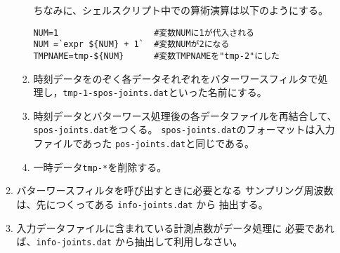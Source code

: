 \documentclass{jarticle}
\begin{document}
\begin{enumerate}
\begin{enumerate}
\begin{enumerate}
      ちなみに、シェルスクリプト中での算術演算は以下のようにする。
\begin{verbatim}
NUM=1                   #変数NUMに1が代入される
NUM =`expr ${NUM} + 1`  #変数NUMが2になる
TMPNAME=tmp-${NUM}      #変数TMPNAMEを"tmp-2"にした
\end{verbatim}
    \item 時刻データをのぞく各データそれぞれをバターワースフィルタで処
      理し，\verb|tmp-1-spos-joints.dat|といった名前にする。
    \item 時刻データとバターワース処理後の各データファイルを再結合して、
      \verb|spos-joints.dat|をつくる。
      \verb|spos-joints.dat|のフォーマットは入力ファイルであった
      \verb|pos-joints.dat|と同じである。
    \item 一時データ\verb|tmp-*|を削除する。
    \end{enumerate}
  \item バターワースフィルタを呼び出すときに必要となる
    サンプリング周波数は、先につくってある \verb|info-joints.dat| から
    抽出する。
  \item 入力データファイルに含まれている計測点数がデータ処理に
    必要であれば、\verb|info-joints.dat| から抽出して利用しなさい。
  \end{enumerate}
\end{enumerate}
\end{document}
